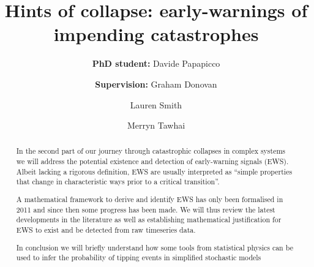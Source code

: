\documentclass[dvipsnames, table, 11pt]{article}
\begin{document}
     \title{Hints of collapse: early-warnings of impending catastrophes}

     \author[*]{\textbf{PhD student:} Davide Papapicco}
     \author[*]{\authorcr \textbf{Supervision:} Graham Donovan}
     \author[*]{Lauren Smith}
     \author[$\dagger$]{Merryn Tawhai}

 
     \date{}

     \maketitle

     \begin{abstract}
             In the second part of our journey through catastrophic collapses in complex systems we will address the potential existence and detection of early-warning signals (EWS). Albeit lacking a rigorous definition, EWS are usually interpreted as “simple properties that change in characteristic ways prior to a critical transition”. 

             A mathematical framework to derive and identify EWS has only been formalised in 2011 and since then some progress has been made. We will thus review the latest developments in the literature as well as establishing mathematical justification for EWS to exist and be detected from raw timeseries data. 

             In conclusion we will briefly understand how some tools from statistical physics can be used to infer the probability of tipping events in simplified stochastic models
     \end{abstract}
\end{document}
